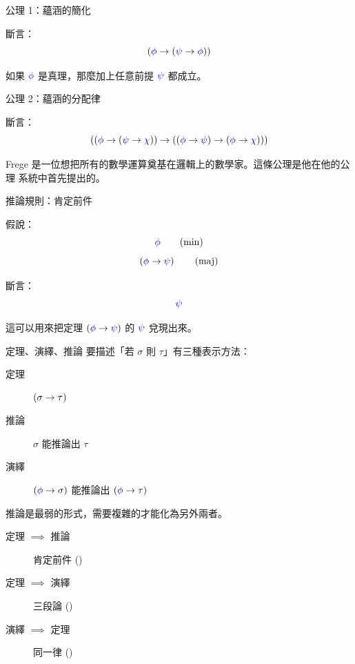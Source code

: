 \documentclass{Slideshow}
\begin{document}
\begin{frame}{公理 1：蘊涵的簡化}
    \begin{axiom}[\mmurl{ax-1}]
        斷言：
        \[ \left( {\color{blue}\phi} \to \left( {\color{blue}\psi} \to {\color{blue}\phi} \right) \right) \]
    \end{axiom}

    如果 ${\color{blue}\phi}$ 是真理，那麼加上任意前提 ${\color{blue}\psi}$ 都成立。
\end{frame}

\newcommand{\aIIi}[3]{\wi{\wi{#1}{#2}}{\wi{#1}{#3}}}
\newcommand{\axII}[3]{\wi{\wi{#1}{\wi{#2}{#3}}}{\aIIi{#1}{#2}{#3}}}

\begin{frame}{公理 2：蘊涵的分配律}
    \begin{axiom}[\mmurl{ax-2}]
        斷言：
        \[ \axII\wph\wps\wch \]
    \end{axiom}

    Frege 是一位想把所有的數學運算奠基在邏輯上的數學家。這條公理是他在他的公理
    系統中首先提出的。
\end{frame}

\begin{frame}{推論規則：肯定前件}
    \begin{axiom}[\mmurl{ax-mp}]
        假說：
        \[ {\color{blue}\phi}        \tag{min} \]
        \[ \left( {\color{blue}\phi} \to {\color{blue}\psi} \right) \tag{maj} \]

        斷言：
        \[ {\color{blue}\psi} \]
    \end{axiom}

    這可以用來把定理 $\left( {\color{blue}\phi} \to {\color{blue}\psi} \right)$ 的 ${\color{blue}\psi}$ 兌現出來。
\end{frame}

\begin{frame}{定理、演繹、推論}
    要描述「若 $\sigma$ 則 $\tau$」有三種表示方法：
    \begin{description}
        \item[定理] $\left( \sigma \to \tau \right)$
        \item[推論] $\sigma$ 能推論出 $\tau$
        \item[演繹] $\left( {\color{blue}\phi} \to \sigma \right)$ 能推論出 $\left( {\color{blue}\phi} \to \tau \right)$
    \end{description}

    推論是最弱的形式，需要複雜的才能化為另外兩者。
    \begin{description}
        \item[定理 $\implies$ 推論] 肯定前件 ()
        \item[定理 $\implies$ 演繹] 三段論 ()
        \item[演繹 $\implies$ 定理] 同一律 ()
    \end{description}
\end{frame}
\end{document}
